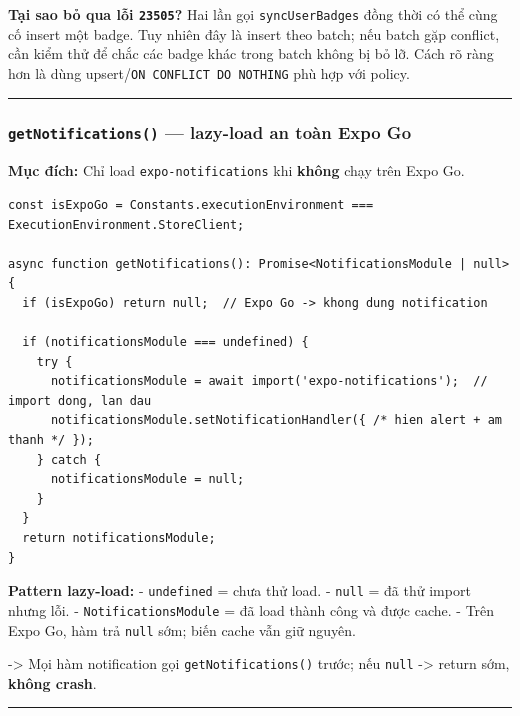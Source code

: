 \documentclass[12pt,a4paper]{article}
\providecommand{\passthrough}[1]{#1}
\begin{document}
\textbf{Tại sao bỏ qua lỗi \passthrough{\lstinline!23505!}?} Hai lần gọi
\passthrough{\lstinline!syncUserBadges!} đồng thời có thể cùng cố insert
một badge. Tuy nhiên đây là insert theo batch; nếu batch gặp conflict,
cần kiểm thử để chắc các badge khác trong batch không bị bỏ lỡ. Cách rõ
ràng hơn là dùng upsert/\passthrough{\lstinline!ON CONFLICT DO NOTHING!}
phù hợp với policy.

\begin{center}\rule{0.5\linewidth}{0.5pt}\end{center}

\subsubsection{\texorpdfstring{\texttt{getNotifications()} --- lazy-load
an toàn Expo
Go}{getNotifications() --- lazy-load an toàn Expo Go}}\label{getnotifications-lazy-load-an-touxe0n-expo-go}

\textbf{Mục đích:} Chỉ load \passthrough{\lstinline!expo-notifications!}
khi \textbf{không} chạy trên Expo Go.

\begin{lstlisting}
const isExpoGo = Constants.executionEnvironment === ExecutionEnvironment.StoreClient;

async function getNotifications(): Promise<NotificationsModule | null> {
  if (isExpoGo) return null;  // Expo Go -> khong dung notification

  if (notificationsModule === undefined) {
    try {
      notificationsModule = await import('expo-notifications');  // import dong, lan dau
      notificationsModule.setNotificationHandler({ /* hien alert + am thanh */ });
    } catch {
      notificationsModule = null;
    }
  }
  return notificationsModule;
}

\end{lstlisting}

\textbf{Pattern lazy-load:} - \passthrough{\lstinline!undefined!} = chưa
thử load. - \passthrough{\lstinline!null!} = đã thử import nhưng lỗi. -
\passthrough{\lstinline!NotificationsModule!} = đã load thành công và
được cache. - Trên Expo Go, hàm trả \passthrough{\lstinline!null!} sớm;
biến cache vẫn giữ nguyên.

-\textgreater{} Mọi hàm notification gọi
\passthrough{\lstinline!getNotifications()!} trước; nếu
\passthrough{\lstinline!null!} -\textgreater{} return sớm, \textbf{không
crash}.

\begin{center}\rule{0.5\linewidth}{0.5pt}\end{center}
\end{document}
